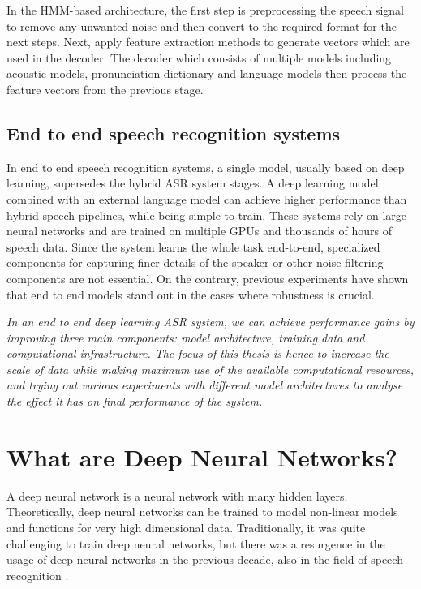 In the HMM-based architecture, the first step is preprocessing the speech signal to remove any unwanted noise and then convert to the required format for the next steps. Next, apply feature extraction methods to generate vectors which are used in the decoder. The decoder which consists of multiple models including acoustic models, pronunciation dictionary and language models then process the feature vectors from the previous stage.

\subsection{End to end speech recognition systems}
\label{section:e2easr}
In end to end speech recognition systems, a single model, usually based on deep learning, supersedes the hybrid ASR system stages. A deep learning model combined with an external language model can achieve higher performance than hybrid speech pipelines, while being simple to train. These systems rely on large neural networks and are trained on multiple GPUs and thousands of hours of speech data. Since the system learns the whole task end-to-end, specialized components for capturing finer details of the speaker or other noise filtering components are not essential. On the contrary, previous experiments have shown that end to end models stand out in the cases where robustness is crucial. \cite{Hannun2014DeepRecognition}. 

\emph{In an end to end deep learning ASR system, we can achieve performance gains by improving three main components: model architecture, training data and computational infrastructure. The focus of this thesis is hence to increase the scale of data while making maximum use of the available computational resources, and trying out various experiments with different model architectures to analyse the effect it has on final performance of the system.}

\section{What are Deep Neural Networks?}
A deep neural network is a neural network with many hidden layers. Theoretically, deep neural networks can be trained to model non-linear models and functions for very high dimensional data. Traditionally, it was quite challenging to train deep neural networks, but there was a resurgence in the usage of deep neural networks in the previous decade, also in the field of speech recognition \cite{Dahl2012Context-DependentRecognition, Morgan2012DeepRecognition, DengRECENTMICROSOFT, Hannun2014DeepRecognition}. 


